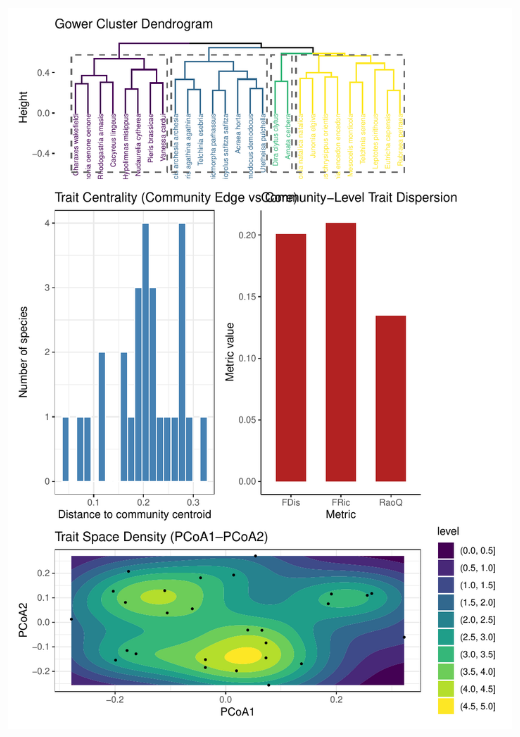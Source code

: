 \documentclass[
]{article}
\begin{document}
\includegraphics[width=1\linewidth]{man/figures/README-func-test-1}
\end{document}
